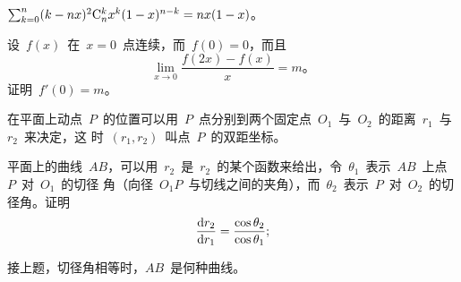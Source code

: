 \begin{exercise*}
\begin{exlistcols}
  \item $\sum_{k=0}^n(k-nx)^2\mathrm C_{n}^{k}x^k(1-x)^{n-k}=nx(1-x)$。
\end{exlistcols}
\item 设~$f(x)$~在~$x=0$~点连续，而~$f(0)=0$，而且
\[
  \lim_{x\to0}\dfrac{f(2x)-f(x)}x=m 。
\]
证明~$f'(0)=m$。
\item 在平面上动点~$P$~的位置可以用~$P$~点分别到两个固定点~$O_1$~与~$O_2$~的距离~$r_1$~与~$r_2$~来决定，这
时~$(r_1,r_2)$~叫点~$P$~的双距坐标。
\begin{exlist}
  \item 平面上的曲线~$AB$，可以用~$r_2$~是~$r_2$~的某个函数来给出，令~$\theta_1$~表示~$AB$~上点~$P$~对~$O_1$~的切径
  角（向径~$O_1P$~与切线之间的夹角），而~$\theta_2$~表示~$P$~对~$O_2$~的切径角。证明
  \[
    \dfrac{\mathop{}\negthinspace\mathrm d r_2}{\mathop{}\negthinspace\mathrm d r_1}=\dfrac{\cos\theta_2}{\cos\theta_1};
  \]
  \item 接上题，切径角相等时，$AB$~是何种曲线。
\end{exlist}
\end{exercise*}


\endinput
